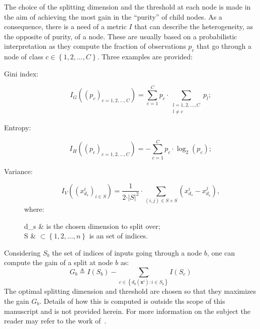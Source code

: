         The choice of the splitting dimension and the threshold at each node is made in the aim of achieving the most gain in the ``purity'' of child nodes.
        As a consequence, there is a need of a metric $I$ that can describe the heterogeneity, as the opposite of purity, of a node.
        These are usually based on a probabilistic interpretation as they compute the fraction of observations $p_c$ that go through a node of class $c \in \left\{1, 2, \dots, C\right\}$.
        Three examples are provided:
        \begin{description}
            \item[Gini index:]
            \begin{equation}
                \label{eq::gini}
                I_G\left(\left(p_c\right)_{c=1, 2, \dots, C}\right) = \sum_{c=1}^{C} p_c \cdot \sum_{\substack{l=1, 2, \dots, C\\l \neq c}} p_l;
            \end{equation}
            \item[Entropy:]
            \begin{equation}
                \label{eq::entropy}
                I_H\left(\left(p_c\right)_{c=1, 2, \dots, C}\right) = - \sum_{c=1}^{C} p_c \cdot \log_2(p_c);
            \end{equation}
            \item[Variance:]
            \begin{equation}
                \label{eq::variance_index}
                I_V\left(\left(x_{d_s}^i\right)_{i\in S}\right) = \frac{1}{2 \cdot \vert S \vert^2} \cdot \sum_{(i,j) \in S\times S} \left(x_{d_s}^i - x_{d_s}^j\right),
            \end{equation}
            where:
            \begin{conditions}
                d_s & is the chosen dimension to split over;\\
                S & $\subset \left\{1, 2, \dots, n\right\}$ is an set of indices.
            \end{conditions}
        \end{description}
        Considering $S_b$ the set of indices of inputs going through a node $b$, one can compute the gain of a split at node $b$ as:
        \begin{equation}
            \label{eq::split_gain}
            G_b \triangleq I(S_b) - \sum_{c \in \left\{d_b(\bm{x}^i): i \in S_b\right\}} I(S_c)
        \end{equation}
        The optimal splitting dimension and threshold are chosen so that they maximizes the gain $G_b$.
        Details of how this is computed is outside ths scope of this manuscript and is not provided herein.
        For more information on the subject the reader may refer to the work of~\textcite{breiman1984classification}.\\

